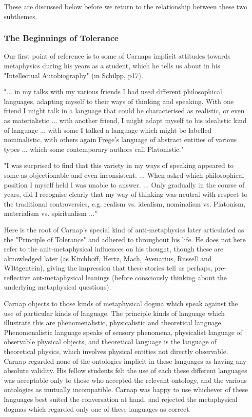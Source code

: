 \documentclass[10pt,titlepage]{book}
\begin{document}
These are discussed below before we return to the relationship between these two subthemes.

\subsubsection{The Beginnings of Tolerance}

Our first point of reference is to some of Carnaps implicit attitudes towards metaphysics during his years as a student, which he tells us about in his "Intellectual Autobiography" (in Schilpp, p17\cite{carnap63a}). 

"... in my talks with my various friends I had used different philosophical languages, adapting myself to their ways of thinking and speaking.  With one friend I might talk in a language that could be characterised as realistic, or even as materialistic ... with another friend, I might adapt myself to his idealistic kind of language  ... with some I talked a language which might be labelled nominalistic, with others again Frege's language of abstract entities of various types ... which some contemporary authors call Platonistic."

"I was surprised to find that this variety in my ways of speaking appeared to some as objectionable and even inconsistent. ... When asked which philosophical position I myself held I was unable to answer. ... Only gradually in the course of years, did I recognise clearly that my way of thinking  was neutral with respect to the traditional controversies, e.g. realism vs. idealism, nominalism vs. Platonism, materialism vs. spiritualism ..."

Here is the root of Carnap's special kind of anti-metaphysics later articulated as the "Principle of Tolerance" and adhered to throughout his life.  He does not here refer to the anit-metaphysical influences on his thought, though these are aknowledged later (as Kirchhoff, Hertz, Mach, Avenarius, Russell and WIttgentein), giving the impression that these stories tell us perhaps, pre-reflective ant-metaphysical leanings (before consciously thinking about the underlying metaphysical questions).

Carnap objects to those kinds of metaphysical dogma which speak against the use of particular kinds of language.  The principle kinds of language which illustrate this are phenomenalistic, physicalistic and theoretical language.  Phenomenalistic language speaks of sensory phenomena, physicalist language of observable physical objects, and theoretical language is the language of theoretical physics, which involves physical entities not directly observable.  Carnap regarded none of the ontologies implicit in these languages as having any absolute validity.  His fellow students felt the use of each these different languages was acceptable only to those who accepted the relevant ontology, and the various ontologies as mutually incompatible.  Carnap was happy to use whichever of these languages best suited the conversation at hand, and rejected the metaphysical dogmas which regarded only one of these languages as correct.
\end{document}

